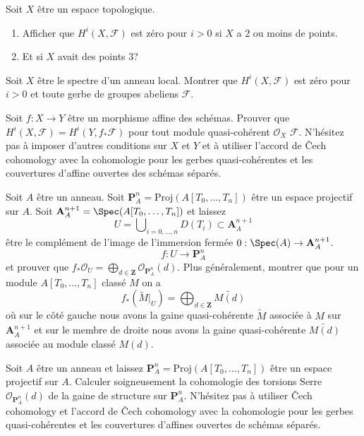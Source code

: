 \begin{exercise}
\label{exercise-cohomology-two-point-space}
Soit $X$ être un espace topologique.
\begin{enumerate}
\item Afficher que $H^i(X, \mathcal{F})$ est zéro pour $i > 0$ si
$X$ a $2$ ou moins de points.
\item Et si $X$ avait des points $3$?
\end{enumerate}
\end{exercise}

\begin{exercise}
\label{exercise-cohomology-spec-local-ring}
Soit $X$ être le spectre d'un anneau local. Montrer
que $H^i(X, \mathcal{F})$ est zéro pour $i > 0$
et toute gerbe de groupes abeliens $\mathcal{F}$.
\end{exercise}

\begin{exercise}
\label{exercise-affine-morphism}
Soit $f : X \to Y$ être un
morphisme affine des schémas. Prouver que $H^i(X, \mathcal{F}) =
H^i(Y, f_*\mathcal{F})$ pour tout module quasi-cohérent $\mathcal{O}_X$ $\mathcal{F}$. N'hésitez pas
à imposer d'autres conditions sur $X$ et $Y$ et
à utiliser l'accord de {\v C}ech cohomology avec la cohomologie
pour les gerbes quasi-cohérentes et les couvertures d'affine ouvertes des schémas séparés.
\end{exercise}

\begin{exercise}
\label{exercise-affine-morphism-to-Pn}
Soit $A$ être un anneau. Soit $\mathbf{P}^n_A = \text{Proj}(A[T_0, \ldots, T_n])$ être
un espace projectif sur $A$.
Soit $\mathbf{A}^{n + 1}_A = \Spec(A[T_0, \ldots, T_n])$ et laissez
$$
U = \bigcup\nolimits_{i = 0, \ldots, n} D(T_i) \subset \mathbf{A}^{n + 1}_A
$$
être le complément de l'image de
l'immersion fermée $0 : \Spec(A)
\to \mathbf{A}^{n + 1}_A$.
$$
f : U \longrightarrow \mathbf{P}^n_A
$$
et prouver que $f_*\mathcal{O}_U
= \bigoplus_{d \in \mathbf{Z}} \mathcal{O}_{\mathbf{P}^n_A}(d)$. Plus généralement, montrer que
pour un module $A[T_0, \ldots, T_n]$ classé $M$ on
a
$$
f_*(\widetilde{M}|_U) =
\bigoplus\nolimits_{d \in \mathbf{Z}} \widetilde{M(d)}
$$
où sur le côté gauche nous avons la gaine
quasi-cohérente $\widetilde{M}$ associée à $M$ sur $\mathbf{A}^{n + 1}_A$
et sur le membre de droite nous avons
la gaine quasi-cohérente $\widetilde{M(d)}$ associée au module classé $M(d)$.
\end{exercise}

\begin{exercise}
\label{exercise-compute-Pn}
Soit $A$ être un anneau et laissez $\mathbf{P}^n_A = \text{Proj}(A[T_0, \ldots, T_n])$
être un espace projectif
sur $A$. Calculer soigneusement la cohomologie des torsions
Serre $\mathcal{O}_{\mathbf{P}^n_A}(d)$ de la gaine de structure
sur $\mathbf{P}^n_A$. N'hésitez pas à utiliser {\v C}ech cohomology et
l'accord de {\v C}ech cohomology avec la cohomologie pour
les gerbes quasi-cohérentes et les couvertures d'affines ouvertes de schémas séparés.
\end{exercise}

